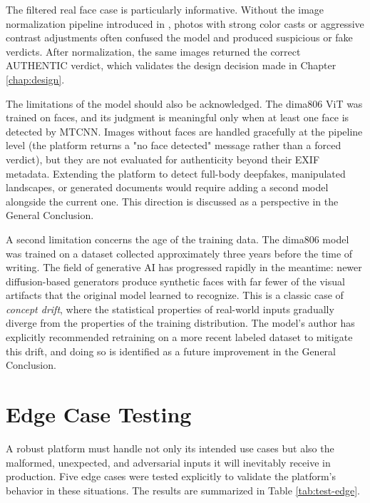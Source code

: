 The filtered real face case is particularly informative. Without the image normalization pipeline introduced in , photos with strong color casts or aggressive contrast adjustments often confused the model and produced suspicious or fake verdicts. After normalization, the same images returned the correct AUTHENTIC verdict, which validates the design decision made in Chapter \ref{chap:design}.

The limitations of the model should also be acknowledged. The dima806 ViT was trained on faces, and its judgment is meaningful only when at least one face is detected by MTCNN. Images without faces are handled gracefully at the pipeline level (the platform returns a "no face detected" message rather than a forced verdict), but they are not evaluated for authenticity beyond their EXIF metadata. Extending the platform to detect full-body deepfakes, manipulated landscapes, or generated documents would require adding a second model alongside the current one. This direction is discussed as a perspective in the General Conclusion.

A second limitation concerns the age of the training data. The dima806 model was trained on a dataset collected approximately three years before the time of writing. The field of generative AI has progressed rapidly in the meantime: newer diffusion-based generators produce synthetic faces with far fewer of the visual artifacts that the original model learned to recognize. This is a classic case of \textit{concept drift}, where the statistical properties of real-world inputs gradually diverge from the properties of the training distribution. The model's author has explicitly recommended retraining on a more recent labeled dataset to mitigate this drift, and doing so is identified as a future improvement in the General Conclusion.

\section{Edge Case Testing}

A robust platform must handle not only its intended use cases but also the malformed, unexpected, and adversarial inputs it will inevitably receive in production. Five edge cases were tested explicitly to validate the platform's behavior in these situations. The results are summarized in Table \ref{tab:test-edge}.

